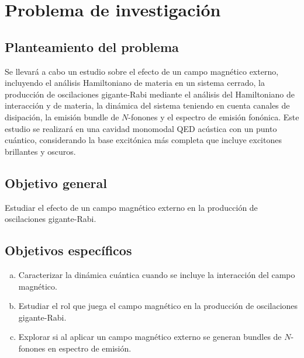 \documentclass[../main.tex]{subfiles}
\begin{document}
\chapter{Problema de investigación}
\section{Planteamiento del problema}
Se llevará a cabo un estudio sobre el efecto de un campo magnético externo, incluyendo el análisis Hamiltoniano de materia en un sistema cerrado, la producción de oscilaciones gigante-Rabi mediante el análisis del Hamiltoniano de interacción y de materia, la dinámica del sistema teniendo en cuenta canales de disipación, la emisión bundle de $N$-fonones y el espectro de emisión fonónica. Este estudio se realizará en una cavidad monomodal QED acústica con un punto cuántico, considerando la base excitónica más completa que incluye excitones brillantes y oscuros.

\section{Objetivo general}
Estudiar el efecto de un campo magnético externo en la producción de oscilaciones gigante-Rabi.
\section{Objetivos específicos}
\begin{enumerate}[(a)]
	\item Caracterizar la din\'amica cu\'antica cuando se incluye la interacción del campo magnético.
	\item Estudiar el rol que juega el campo magnético en la producción de oscilaciones gigante-Rabi.
	\item Explorar si al aplicar un campo magnético externo se generan bundles de $N$-fonones en espectro de emisi\'on.
\end{enumerate}
\end{document}
